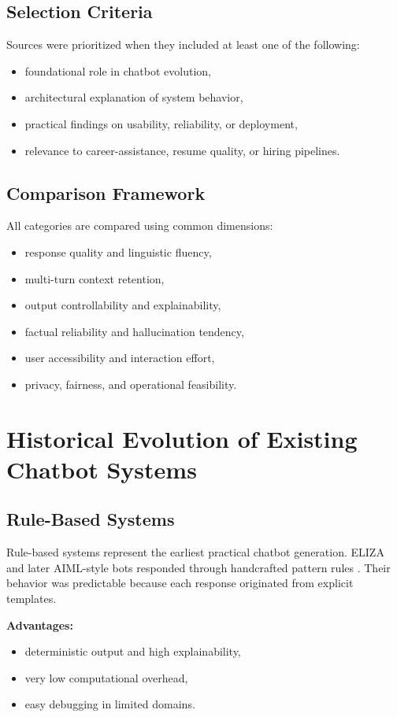\documentclass[conference]{IEEEtran}
\begin{document}
\subsection{Selection Criteria}
Sources were prioritized when they included at least one of the following:
\begin{itemize}
    \item foundational role in chatbot evolution,
    \item architectural explanation of system behavior,
    \item practical findings on usability, reliability, or deployment,
    \item relevance to career-assistance, resume quality, or hiring pipelines.
\end{itemize}

\subsection{Comparison Framework}
All categories are compared using common dimensions:
\begin{itemize}
    \item response quality and linguistic fluency,
    \item multi-turn context retention,
    \item output controllability and explainability,
    \item factual reliability and hallucination tendency,
    \item user accessibility and interaction effort,
    \item privacy, fairness, and operational feasibility.
\end{itemize}

\section{Historical Evolution of Existing Chatbot Systems}
\subsection{Rule-Based Systems}
Rule-based systems represent the earliest practical chatbot generation. ELIZA and later AIML-style bots responded through handcrafted pattern rules \cite{weizenbaum1966,wallace2009}. Their behavior was predictable because each response originated from explicit templates.

\textbf{Advantages:}
\begin{itemize}
    \item deterministic output and high explainability,
    \item very low computational overhead,
    \item easy debugging in limited domains.
\end{itemize}
\end{document}
